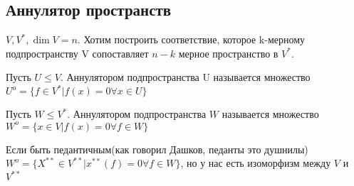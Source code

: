 \subsection{Аннулятор пространств}
\(V, V^{*}, \dim V = n\). Хотим построить соответствие, которое k-мерному подпространству V сопоставляет \(n-k\) мерное пространство в \(V^{*}\). \newline
\begin{definition}
	Пусть \(U\le V\). Аннулятором подпространства U называется множество \(U^o = \{f\in V^{*}| f(x) = 0 \forall x\in U\}\)
\end{definition}
\begin{definition}
	Пусть \(W\le V^{*}\). Аннулятором подпространства \(W\) называется множество \(W^o = \{x\in V | f(x) = 0\forall f\in W\}\)
\end{definition}
\begin{note}
	Если быть педантичным(как говорил Дашков, педанты это душнилы) \(W^o = \{X^{**}\in V^{**}|x^{**}(f) = 0\forall f\in W\}\), но у нас есть изоморфизм между \(V\) и \(V^{**}\)
\end{note}
